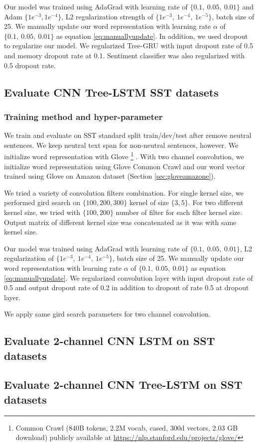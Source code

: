 Our model was trained using AdaGrad \cite{duchi2011adaptive} with learning rate of $\{0.1,~ 0.05,~ 0.01\}$ and Adam $\{1e^{-3}, 1e^{-4}\}$, L2 regularization strength of $\{1e^{-3},~ 1e^{-4}, ~ 1e^{-5} \}$, batch size of 25. We manually update our word representation with learning rate $\alpha$ of $\{0.1,~0.05, ~0.01\}$ as equation \ref{eq:manuallyupdate}. In addition, we used dropout \cite{krizhevsky2012imagenet} to regularize our model. We regularized Tree-GRU with input dropout rate of 0.5 and memory dropout rate at 0.1. Sentiment classifier was also regularized with 0.5 dropout rate. 
\subsection{Evaluate CNN Tree-LSTM SST datasets}
\subsubsection{Training method and hyper-parameter}
We train and evaluate on SST standard split train/dev/test after remove neutral sentences. We keep neutral text span for non-neutral sentences, however. We initialize word representation with Glove \footnote{\label{glovecommoncrawl}Common Crawl (840B tokens, 2.2M vocab, cased, 300d vectors, 2.03 GB download) publicly available at \url{https://nlp.stanford.edu/projects/glove/}} \cite{glove}. With two channel convolution, we initialize word representation using Glove Common Crawl and our word vector trained using Glove on Amazon dataset (Section \ref{sec:gloveamazone}). 

We tried a variety of convolution filters combination. For single kernel size, we performed gird search on $\{100, 200, 300\}$ kernel of size $\{3, 5\}$. For two different kernel size, we tried with $\{100, 200\}$ number of filter for each filter kernel size. Output matrix of different kernel size was concatenated as it was with same kernel size. 

Our model was trained using AdaGrad \cite{duchi2011adaptive} with learning rate of $\{0.1,~ 0.05,~ 0.01\}$, L2 regularization of $\{1e^{-3},~ 1e^{-4}, ~ 1e^{-5} \}$, batch size of 25. We manually update our word representation with learning rate $\alpha$ of $\{0.1,~0.05, ~0.01\}$ as equation \ref{eq:manuallyupdate}. We regularized convolution layer with input dropout rate of 0.5 and output dropout rate of 0.2 in addition to dropout of rate 0.5 at dropout layer. 

We apply same gird search parameters for two channel convolution. 
\subsection{Evaluate 2-channel CNN LSTM on SST datasets}
\subsection{Evaluate 2-channel CNN Tree-LSTM on SST datasets}